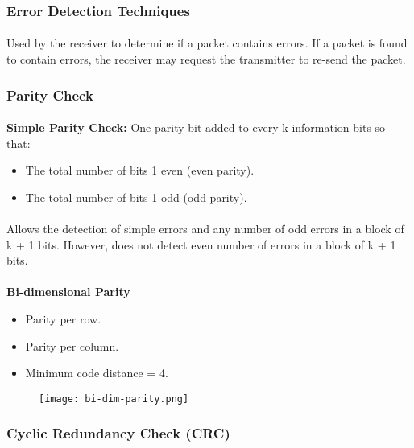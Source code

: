 \documentclass[../resumosRCOM.tex]{subfiles}
\begin{document}
\subsubsection{Error Detection Techniques}
\paragraph{}
Used by the receiver to determine if a packet contains errors. If a packet is 
found to contain errors, the receiver may request the transmitter to re-send 
the packet.

\subsubsection{Parity Check}

\paragraph{}
\textbf{Simple Parity Check:}
One parity bit added to every k information bits so that:
\begin{itemize}
    \item The total number of bits 1 even (even parity).
    \item The total number of bits 1 odd (odd parity).
\end{itemize}
\paragraph{}
Allows the detection of simple errors and any number of odd errors in a block of 
k + 1 bits. However, does not detect even number of errors in a block of k + 1 bits.

\paragraph{}
\textbf{Bi-dimensional Parity}
\begin{itemize}
    \item Parity per row.
    \item Parity per column.
    \item Minimum code distance = 4.
\end{itemize}

\begin{figure}[H]
    \centering
    \texttt{[image: bi-dim-parity.png]}
\end{figure}


\subsubsection{Cyclic Redundancy Check (CRC)}
\end{document}
